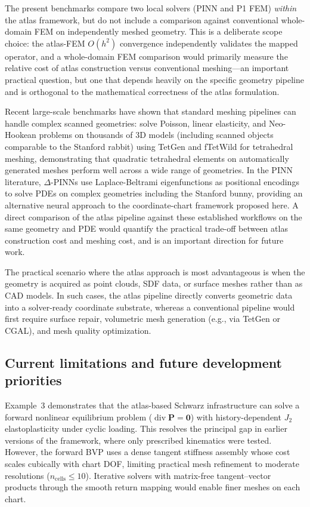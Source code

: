 \documentclass[sort&compress]{svjour3} %
\begin{document}
The present benchmarks compare two local solvers (PINN and P1 FEM) \emph{within} the atlas framework, but do not include a comparison against conventional whole-domain FEM on independently meshed geometry. This is a deliberate scope choice: the atlas-FEM $O(h^2)$ convergence independently validates the mapped operator, and a whole-domain FEM comparison would primarily measure the relative cost of atlas construction versus conventional meshing---an important practical question, but one that depends heavily on the specific geometry pipeline and is orthogonal to the mathematical correctness of the atlas formulation.

Recent large-scale benchmarks have shown that standard meshing pipelines can handle complex scanned geometries: \citet{schneider2022large} solve Poisson, linear elasticity, and Neo-Hookean problems on thousands of 3D models (including scanned objects comparable to the Stanford rabbit) using TetGen and fTetWild for tetrahedral meshing, demonstrating that quadratic tetrahedral elements on automatically generated meshes perform well across a wide range of geometries. In the PINN literature, $\Delta$-PINNs \citep{sahli2024deltapinns} use Laplace-Beltrami eigenfunctions as positional encodings to solve PDEs on complex geometries including the Stanford bunny, providing an alternative neural approach to the coordinate-chart framework proposed here. A direct comparison of the atlas pipeline against these established workflows on the same geometry and PDE would quantify the practical trade-off between atlas construction cost and meshing cost, and is an important direction for future work.

The practical scenario where the atlas approach is most advantageous is when the geometry is acquired as point clouds, SDF data, or surface meshes rather than as CAD models. In such cases, the atlas pipeline directly converts geometric data into a solver-ready coordinate substrate, whereas a conventional pipeline would first require surface repair, volumetric mesh generation (e.g., via TetGen or CGAL), and mesh quality optimization.

\subsection{Current limitations and future development priorities}
Example~3 demonstrates that the atlas-based Schwarz infrastructure can solve a forward nonlinear equilibrium problem ($\operatorname{div}\mathbf{P}=\mathbf{0}$) with history-dependent $J_2$ elastoplasticity under cyclic loading. This resolves the principal gap in earlier versions of the framework, where only prescribed kinematics were tested. However, the forward BVP uses a dense tangent stiffness assembly whose cost scales cubically with chart DOF, limiting practical mesh refinement to moderate resolutions ($n_{\mathrm{cells}}\leq 10$). Iterative solvers with matrix-free tangent--vector products through the smooth return mapping would enable finer meshes on each chart.
\end{document}
